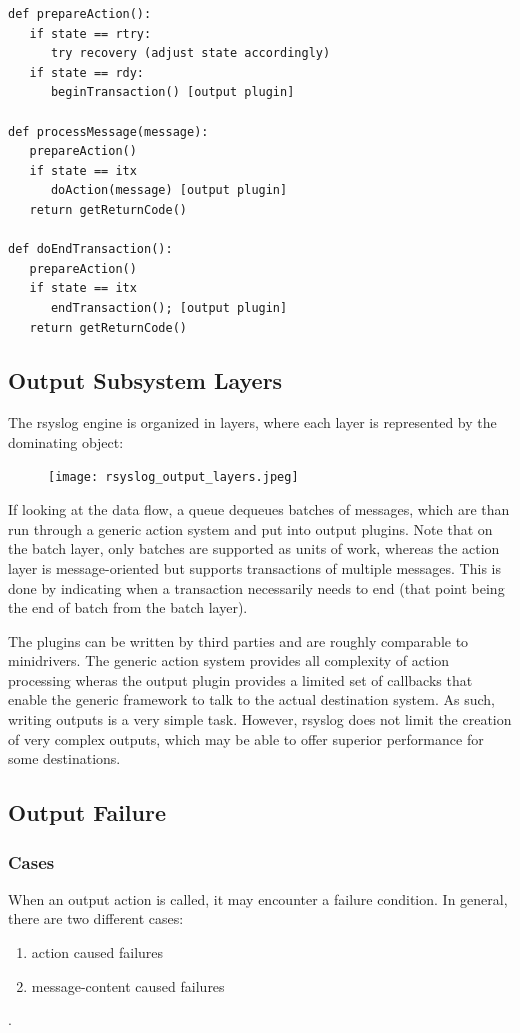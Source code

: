 \documentclass[a4paper,10pt]{article}
\begin{document}
\lstset{language=python}
\begin{lstlisting}
def prepareAction():
   if state == rtry:
      try recovery (adjust state accordingly)
   if state == rdy:
      beginTransaction() [output plugin]
    
def processMessage(message):
   prepareAction()
   if state == itx
      doAction(message) [output plugin]
   return getReturnCode()

def doEndTransaction():
   prepareAction()
   if state == itx
      endTransaction(); [output plugin]
   return getReturnCode()
\end{lstlisting}

\subsection{Output Subsystem Layers}
The rsyslog engine is organized in layers, where each layer is represented by the dominating object:

\begin{figure}
\texttt{[image: rsyslog\_output\_layers.jpeg]}
\label{rsyslog output layers}
\end{figure}

If looking at the data flow, a queue dequeues batches of messages, which are than run through a generic action system and put into output plugins. Note that on the batch layer, only batches are supported as units of work, whereas the action layer is message-oriented but supports transactions of multiple messages. This is done by indicating when a transaction necessarily needs to end (that point being the end of batch from the batch layer).

The plugins can be written by third parties and are roughly comparable to minidrivers. The generic action system provides all complexity of action processing wheras the output plugin provides a limited set of callbacks that enable the generic framework to talk to the actual destination system. As such, writing outputs is a very simple task. However, rsyslog does not limit the creation of very complex outputs, which may be able to offer superior performance for some destinations.

\subsection{Output Failure}
\subsubsection{Cases}
When an output action is called, it may encounter a failure condition. In general, there are two different cases:
\begin{enumerate}
\item action caused failures
\item message-content caused failures
\end{enumerate}.
\end{document}
